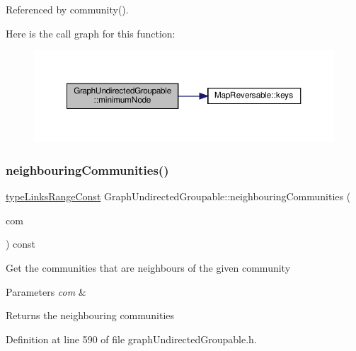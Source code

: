 Referenced by community().

Here is the call graph for this function\+:
\nopagebreak
\begin{figure}[H]
\begin{center}
\leavevmode
\includegraphics[width=350pt]{classGraphUndirectedGroupable_a0ce165b4c68150f60ccd1977b83f3eb3_cgraph}
\end{center}
\end{figure}
\mbox{\label{classGraphUndirectedGroupable_a48823a0162b95a72c22d0ab01a709e1f}} 
\subsubsection{\texorpdfstring{neighbouring\+Communities()}{neighbouringCommunities()}}
{\footnotesize\ttfamily \hyperlink{graphInterface_8h_ae8d27008f15586bbf419af7ad2e0a48a}{type\+Links\+Range\+Const} Graph\+Undirected\+Groupable\+::neighbouring\+Communities (\begin{DoxyParamCaption}\item[{const \hyperlink{graphUndirectedGroupable_8h_a914da95c9ea7f14f4b7f875c36818556}{type\+Community} \&}]{com }\end{DoxyParamCaption}) const\hspace{0.3cm}{\ttfamily [inline]}}

Get the communities that are neighbours of the given community


\begin{DoxyParams}{Parameters}
{\em com} & \\
\hline
\end{DoxyParams}
\begin{DoxyReturn}{Returns}
the neighbouring communities 
\end{DoxyReturn}


Definition at line 590 of file graph\+Undirected\+Groupable.\+h.



